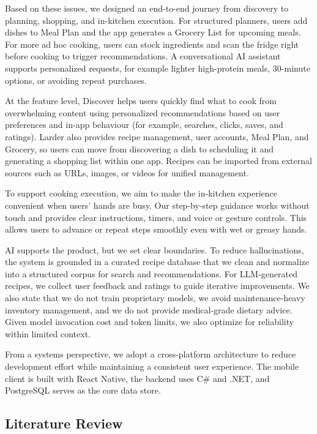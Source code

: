 \documentclass[sigconf]{acmart}
\begin{document}
Based on these issues, we designed an end-to-end journey from discovery to planning, shopping, and in-kitchen execution. For structured planners, users add dishes to Meal Plan and the app generates a Grocery List for upcoming meals. For more ad hoc cooking, users can stock ingredients and scan the fridge right before cooking to trigger recommendations. A conversational AI assistant supports personalized requests, for example lighter high-protein meals, 30-minute options, or avoiding repeat purchases.

At the feature level, Discover helps users quickly find what to cook from overwhelming content using personalized recommendations based on user preferences and in-app behaviour (for example, searches, clicks, saves, and ratings). Larder also provides recipe management, user accounts, Meal Plan, and Grocery, so users can move from discovering a dish to scheduling it and generating a shopping list within one app. Recipes can be imported from external sources such as URLs, images, or videos for unified management.

To support cooking execution, we aim to make the in-kitchen experience convenient when users' hands are busy. Our step-by-step guidance works without touch and provides clear instructions, timers, and voice or gesture controls. This allows users to advance or repeat steps smoothly even with wet or greasy hands.

AI supports the product, but we set clear boundaries. To reduce hallucinations, the system is grounded in a curated recipe database that we clean and normalize into a structured corpus for search and recommendations. For LLM-generated recipes, we collect user feedback and ratings to guide iterative improvements. We also state that we do not train proprietary models, we avoid maintenance-heavy inventory management, and we do not provide medical-grade dietary advice. Given model invocation cost and token limits, we also optimize for reliability within limited context.

From a systems perspective, we adopt a cross-platform architecture to reduce development effort while maintaining a consistent user experience. The mobile client is built with React Native, the backend uses C\# and .NET, and PostgreSQL serves as the core data store.


\subsection{Literature Review}
\end{document}
